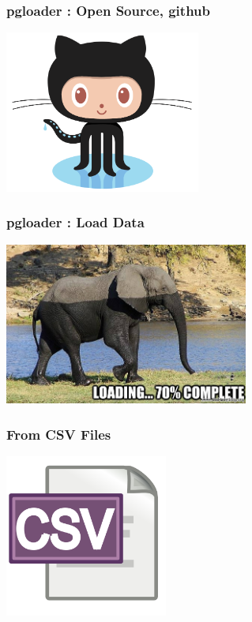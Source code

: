 \documentclass{beamer}
\begin{document}
\begin{frame}
  \frametitle{pgloader : Open Source, github}


  \begin{center}
    \includegraphics[height=2.1in]{Octocat.png}
  \end{center}
\end{frame}

\begin{frame}
  \frametitle{pgloader : Load Data}


  \begin{center}
    \includegraphics[height=2.1in]{elephant-loading.jpg}
  \end{center}
\end{frame}

\begin{frame}
  \frametitle{From CSV Files}


  \begin{center}
    \includegraphics[height=2.1in]{csv_text.png}
  \end{center}
\end{frame}
\end{document}
